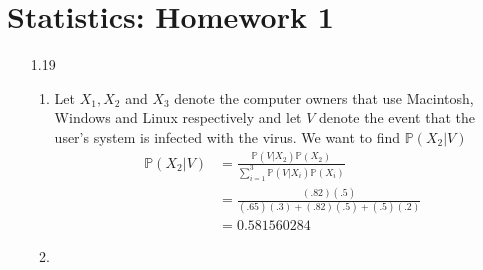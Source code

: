 \documentclass[a4paper,10pt]{article}
\theoremstyle{definition}
\begin{document}
\section*{Statistics: Homework 1}

\begin{enumerate}
\item[1.19] 
\begin{enumerate}
\item Let $X_1, X_2$ and $X_3$ denote the computer owners that use Macintosh, Windows and Linux respectively and let $V$ denote the event that the user's system is infected with the virus. We want to find $\mathbb{P}(X_2 | V)$
\begin{align*}
\mathbb{P}(X_2 | V) &= \frac{\mathbb{P}(V|X_2)\mathbb{P}(X_2)}{\sum_{i=1}^{3}\mathbb{P}(V|X_i)\mathbb{P}(X_i)}\\
&=\frac{(.82)(.5)}{(.65)(.3)+(.82)(.5)+(.5)(.2)}\\
&=0.581560284
\end{align*}
\item


\end{enumerate}
\end{enumerate}
\end{document}
